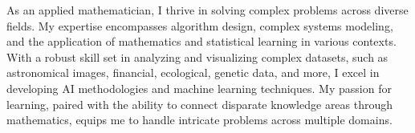 

\begin{cvparagraph}



As an applied mathematician, I thrive in solving complex problems across diverse fields. My expertise encompasses algorithm design, complex systems modeling, and the application of mathematics and statistical learning in various contexts. With a robust skill set in analyzing and visualizing complex datasets, such as astronomical images, financial, ecological, genetic data, and more, I excel in developing AI methodologies and machine learning techniques. My passion for learning, paired with the ability to connect disparate knowledge areas through mathematics, equips me to handle intricate problems across multiple domains.


\end{cvparagraph}
